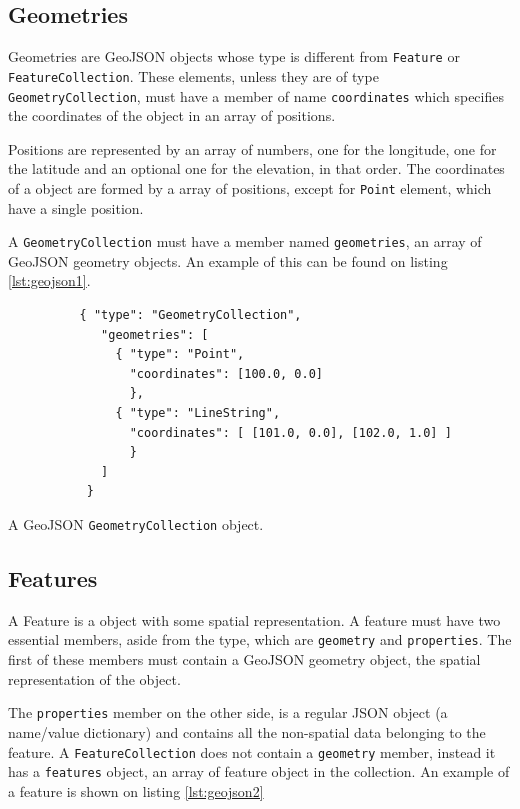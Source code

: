\subsection*{Geometries}

Geometries are GeoJSON objects whose type is different from \texttt{Feature} or \texttt{FeatureCollection}. These elements, unless they are of type \texttt{GeometryCollection}, must have a member of name \texttt{coordinates} which specifies the coordinates of the object in an array of positions.

Positions are represented by an array of numbers, one for the longitude, one for the latitude and an optional one for the elevation, in that order. The coordinates of a object are formed by a array of positions, except for \texttt{Point} element, which have a single position.

A \texttt{GeometryCollection} must have a member named \texttt{geometries}, an array of GeoJSON geometry objects. An example of this can be found on listing \ref{lst:geojson1}.

\begin{listing}\centering
  \begin{minipage}{.6\textwidth}
    \begin{verbatim}
	      { "type": "GeometryCollection",
	         "geometries": [
	           { "type": "Point",
	             "coordinates": [100.0, 0.0]
	             },
	           { "type": "LineString",
	             "coordinates": [ [101.0, 0.0], [102.0, 1.0] ]
	             }
	         ]
	       }
    \end{verbatim}
  \end{minipage}
  \caption{A GeoJSON \texttt{GeometryCollection} object.}\label{lst:geojson1}
\end{listing}

\subsection*{Features}

A Feature is a object with some spatial representation. A feature must have two essential members, aside from the type, which are \texttt{geometry} and \texttt{properties}. The first of these members must contain a GeoJSON geometry object, the spatial representation of the object.

The \texttt{properties} member on the other side, is a regular JSON object (a name/value dictionary) and contains all the non-spatial data belonging to the feature. A \texttt{FeatureCollection} does not contain a \texttt{geometry} member, instead it has a \texttt{features} object, an array of feature object in the collection. An example of a feature is shown on listing \ref{lst:geojson2}

